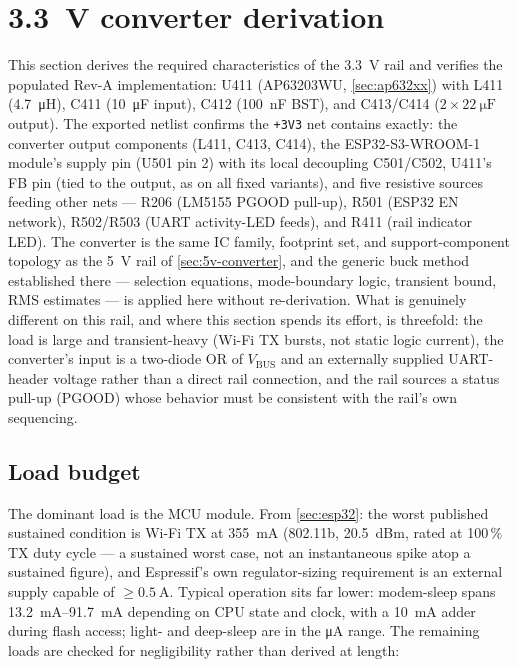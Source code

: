 \section{3.3~V converter derivation}\label{sec:3v3-converter}

This section derives the required characteristics of the 3.3~V rail and verifies the
populated Rev-A implementation: U411 (AP63203WU, \cref{sec:ap632xx}) with L411
(\SI{4.7}{\micro\henry}), C411 (\SI{10}{\micro\farad} input), C412 (\SI{100}{\nano\farad}
BST), and C413/C414 ($2\times\SI{22}{\micro\farad}$ output). The exported netlist confirms
the \texttt{+3V3} net contains exactly: the converter output components (L411, C413,
C414), the ESP32-S3-WROOM-1 module's supply pin (U501 pin 2) with its local decoupling
C501/C502, U411's FB pin (tied to the output, as on all fixed variants), and five
resistive sources feeding other nets --- R206 (LM5155 PGOOD pull-up), R501 (ESP32 EN
network), R502/R503 (UART activity-LED feeds), and R411 (rail indicator LED). The
converter is the same IC family, footprint set, and support-component topology as the 5~V
rail of \cref{sec:5v-converter}, and the generic buck method established there ---
selection equations, mode-boundary logic, transient bound, RMS estimates --- is applied
here without re-derivation. What is genuinely different on this rail, and where this
section spends its effort, is threefold: the load is large and transient-heavy (Wi-Fi TX
bursts, not static logic current), the converter's input is a two-diode OR of
$V_{\mathrm{BUS}}$ and an externally supplied UART-header voltage rather than a direct
rail connection, and the rail sources a status pull-up (PGOOD) whose behavior must be
consistent with the rail's own sequencing.

\subsection{Load budget}\label{sec:3v3-load}

The dominant load is the MCU module. From \cref{sec:esp32}: the worst published sustained
condition is Wi-Fi TX at \SI{355}{\milli\ampere} (802.11b, \SI{20.5}{dBm}, rated at
100\,\% TX duty cycle --- a sustained worst case, not an instantaneous spike atop a
sustained figure), and Espressif's own regulator-sizing requirement is an external supply
capable of $\geq\SI{0.5}{\ampere}$. Typical operation sits far lower: modem-sleep spans
\SIrange{13.2}{91.7}{\milli\ampere} depending on CPU state and clock, with a
\SI{10}{\milli\ampere} adder during flash access; light- and deep-sleep are in the
\si{\micro\ampere} range. The remaining loads are checked for negligibility rather than
derived at length:

